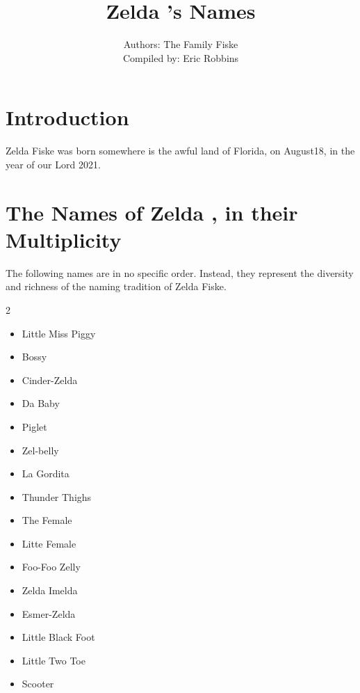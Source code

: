 \documentclass[12pt]{book}
\newcommand{\cat}{Zelda }
\newcommand{\birthMonth}{August}
\newcommand{\birthDay}{18}
\newcommand{\birthYear}{2021}
\newcommand{\birthPlace}{Florida}
\newcommand{\authorName}{Eric Robbins}
\begin{document}
\title{\cat's Names}
\author{Authors: The Family Fiske
	\\Compiled by: \authorName}
\maketitle
\section*{Introduction}
\cat Fiske was born somewhere is the awful land of \birthPlace, on \birthMonth \birthDay, in the year of our Lord \birthYear.
\section*{The Names of \cat, in their Multiplicity}
The following names are in no specific order. Instead, they represent the diversity and richness of the naming tradition of \cat Fiske.

\begin{multicols}{2}
\begin{itemize}
	\item Little Miss Piggy
	\item Bossy
	\item Cinder-Zelda
	\item Da Baby	
	\item Piglet
	\item Zel-belly
	\item La Gordita
  \item Thunder Thighs
	\item The Female
  \item Litte Female
  \item Foo-Foo Zelly
  \item Zelda Imelda
  \item Esmer-Zelda
  \item Little Black Foot
  \item Little Two Toe
  \item Scooter
	\end{itemize}
\end{multicols}	 
\end{document}
